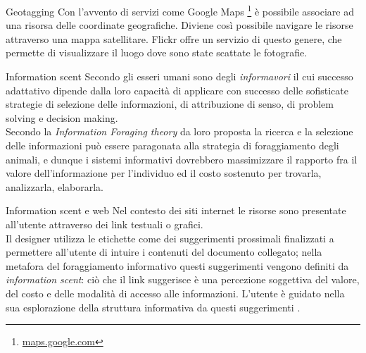 \documentclass[pdf,mpa]{prosper}
\begin{document}
\begin{slide}{Geotagging}
Con l'avvento di servizi come Google Maps \footnote{\href{http://maps.google.com}{maps.google.com}} è possibile associare ad una risorsa delle coordinate geografiche. Diviene così possibile navigare le risorse attraverso una mappa satellitare. Flickr offre un servizio di questo genere, che permette di visualizzare il luogo dove sono state scattate le fotografie.
\end{slide}

\begin{slide}{Information scent}
Secondo \cite{PirolliCard1999} gli esseri umani sono degli \textit{informavori} il cui successo adattativo dipende dalla loro capacità di applicare con successo delle sofisticate strategie di selezione delle informazioni, di attribuzione di senso, di problem solving e decision making.\\
Secondo la \textit{Information Foraging theory} da loro proposta la ricerca e la selezione delle informazioni può essere paragonata alla strategia di foraggiamento degli animali, e dunque i sistemi informativi dovrebbero massimizzare il rapporto fra il valore dell'informazione per l'individuo ed il costo sostenuto per trovarla, analizzarla, elaborarla.
\end{slide}

\begin{slide}{Information scent e web}
Nel contesto dei siti internet le risorse sono presentate all'utente attraverso dei link testuali o grafici.\\
Il designer utilizza le etichette come dei suggerimenti prossimali finalizzati a permettere all'utente di intuire i contenuti del documento collegato; nella metafora del foraggiamento informativo questi suggerimenti vengono definiti da \cite{ChiPirolli2000} \textit{information scent}: ciò che il link suggerisce è una percezione soggettiva del valore, del costo e delle modalità di accesso alle informazioni. L'utente è guidato nella sua esplorazione della struttura informativa da questi suggerimenti \citep{ChiPirolli2001}.\\
\end{slide}
\end{document}
